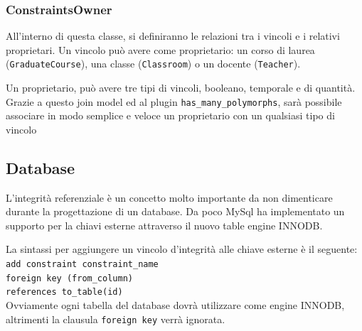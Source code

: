 \documentclass[11pt,a4paper]{article}
\begin{document}
\subsubsection{ConstraintsOwner}
All'interno di questa classe, si definiranno le relazioni tra i vincoli e i relativi proprietari.
Un vincolo può avere come proprietario: un corso di laurea (\verb|GraduateCourse|), una classe (\verb|Classroom|) o un docente (\verb|Teacher|).

Un proprietario, può avere tre tipi di vincoli, booleano, temporale e di quantità.
Grazie a questo join model ed al plugin \verb|has_many_polymorphs|, sarà possibile associare in modo semplice e veloce un proprietario con un qualsiasi tipo di vincolo
\subsection{Database}
L'integrità referenziale è un concetto molto importante da non dimenticare durante la progettazione di un database.
Da poco MySql ha implementato un supporto per la chiavi esterne attraverso il nuovo table engine INNODB.

La sintassi per aggiungere un vincolo d'integrità alle chiave esterne è il seguente:\\
\verb|add constraint constraint_name| \\
\verb|foreign key (from_column)|\\
\verb|references to_table(id)|\\
Ovviamente ogni tabella del database dovrà utilizzare come engine INNODB, altrimenti la clausula \verb|foreign key| verrà ignorata.
\end{document}
